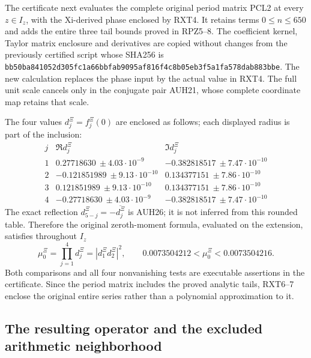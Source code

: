 \documentclass[11pt]{article}
\begin{document}
The certificate next evaluates the complete original period matrix
PCL2 at every $z\in I_z$, with the Xi-derived phase enclosed by
RXT4. It retains terms $0\le n\le650$ and adds the entire
three tail bounds proved in RPZ5--8. The coefficient kernel,
Taylor matrix enclosure and derivatives are copied without changes
from the previously certified script whose SHA256 is
\texttt{bb50ba841052d305fc1a66bbfab9095af816f4c8b05eb3f5a1fa578dab883bbe}.
The new calculation replaces the phase input by the actual value
in RXT4. The full unit scale cancels only in the conjugate pair
AUH21, whose complete coordinate map retains that scale.

The four values $d_j^\Xi=f_j^\Xi(0)$ are enclosed as follows;
each displayed radius is part of the inclusion:
\[
\begin{array}{c|c|c}
 j&\Re d_j^\Xi&\Im d_j^\Xi\\\hline
 1&0.27718630\ \pm4.03\cdot10^{-9}
      &-0.382818517\ \pm7.47\cdot10^{-10}\\
 2&-0.121851989\ \pm9.13\cdot10^{-10}
      &0.134377151\ \pm7.86\cdot10^{-10}\\
 3&0.121851989\ \pm9.13\cdot10^{-10}
      &0.134377151\ \pm7.86\cdot10^{-10}\\
 4&-0.27718630\ \pm4.03\cdot10^{-9}
      &-0.382818517\ \pm7.47\cdot10^{-10}
\end{array}\tag{RXT6}
\]
The exact reflection $d_{5-j}^\Xi=-\overline{d_j^\Xi}$
is AUH26; it is not inferred from this rounded table. Therefore
the original zeroth-moment formula, evaluated on the extension,
satisfies throughout $I_z$
\[
 \mu_0^\Xi=\prod_{j=1}^4d_j^\Xi
           =|d_1^\Xi d_2^\Xi|^2,\qquad
 0.0073504212<\mu_0^\Xi<0.0073504216.
 \tag{RXT7}
\]
Both comparisons and all four nonvanishing tests are executable
assertions in the certificate. Since the period matrix includes
the proved analytic tails, RXT6--7 enclose the original entire
series rather than a polynomial approximation to it.

\subsection{The resulting operator and the excluded arithmetic neighborhood}
\end{document}
